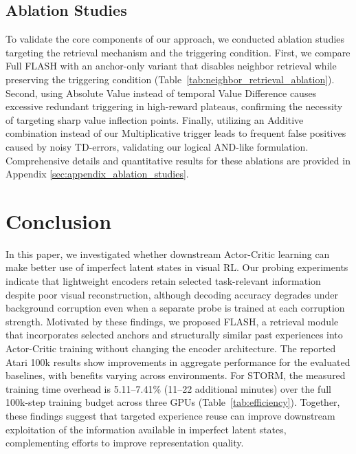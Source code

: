 \documentclass{article} %
\begin{document}
\subsection{Ablation Studies}
\label{subsec:ablation_main}
To validate the core components of our approach, we conducted ablation studies targeting the retrieval mechanism and the triggering condition. First, we compare Full FLASH with an anchor-only variant that disables neighbor retrieval while preserving the triggering condition (Table~\ref{tab:neighbor_retrieval_ablation}). Second, using Absolute Value instead of temporal Value Difference causes excessive redundant triggering in high-reward plateaus, confirming the necessity of targeting sharp value inflection points. Finally, utilizing an Additive combination instead of our Multiplicative trigger leads to frequent false positives caused by noisy TD-errors, validating our logical AND-like formulation. Comprehensive details and quantitative results for these ablations are provided in Appendix \ref{sec:appendix_ablation_studies}.

\section{Conclusion}
\label{sec:conclusion}
In this paper, we investigated whether downstream Actor-Critic learning can make better use of imperfect latent states in visual RL. Our probing experiments indicate that lightweight encoders retain selected task-relevant information despite poor visual reconstruction, although decoding accuracy degrades under background corruption even when a separate probe is trained at each corruption strength. Motivated by these findings, we proposed FLASH, a retrieval module that incorporates selected anchors and structurally similar past experiences into Actor-Critic training without changing the encoder architecture. The reported Atari 100k results show improvements in aggregate performance for the evaluated baselines, with benefits varying across environments. For STORM, the measured training time overhead is 5.11--7.41\% (11--22 additional minutes) over the full 100k-step training budget across three GPUs (Table~\ref{tab:efficiency}). Together, these findings suggest that targeted experience reuse can improve downstream exploitation of the information available in imperfect latent states, complementing efforts to improve representation quality.



\end{document}
